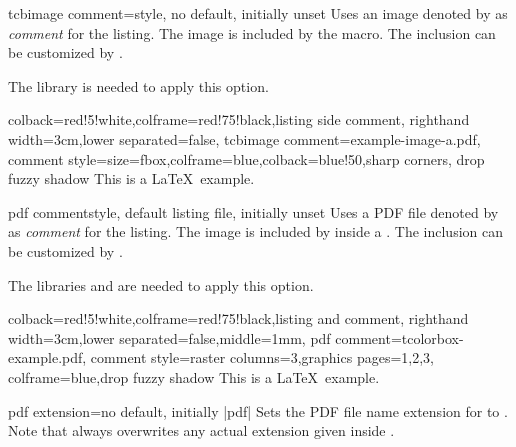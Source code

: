 \clearpage
\begin{docTcbKey}[][doc new=2014-11-14]{tcbimage comment}{=}{style, no default, initially unset}
  Uses an image denoted by  as \textit{comment} for the listing.
  The image is included by the  macro.
  The inclusion can be customized by .
  \begin{marker}
  The library  is needed to apply this option.
  \end{marker}
  \medskip
\begin{dispExample}
\begin{tcblisting}{colback=red!5!white,colframe=red!75!black,listing side comment,
  righthand width=3cm,lower separated=false,
  tcbimage comment={example-image-a.pdf},
  comment style={size=fbox,colframe=blue,colback=blue!50,sharp corners,
    drop fuzzy shadow}}
This is a \LaTeX\ example.
\end{tcblisting}
\end{dispExample}
\end{docTcbKey}

\clearpage

\begin{docTcbKey}[][doc new=2014-11-14]{pdf comment}{}{style, default listing file, initially unset}
  Uses a PDF file denoted by  as \textit{comment} for the listing.
  The image is included by  inside a .
  The inclusion can be customized by .
  \begin{marker}
  The libraries  and  are needed to apply this option.
  \end{marker}
  \medskip
\begin{dispExample}
\begin{tcblisting}{colback=red!5!white,colframe=red!75!black,listing and comment,
  righthand width=3cm,lower separated=false,middle=1mm,
  pdf comment={tcolorbox-example.pdf},
  comment style={raster columns=3,graphics pages={1,2,3},
    colframe=blue,drop fuzzy shadow}}
This is a \LaTeX\ example.
\end{tcblisting}
\end{dispExample}
\end{docTcbKey}

\clearpage


\begin{docTcbKey}[][doc new=2014-11-14]{pdf extension}{=}{no default, initially |pdf|}
  Sets the PDF file name extension for  to .
  Note that  always overwrites any actual extension given
  inside .
\end{docTcbKey}


